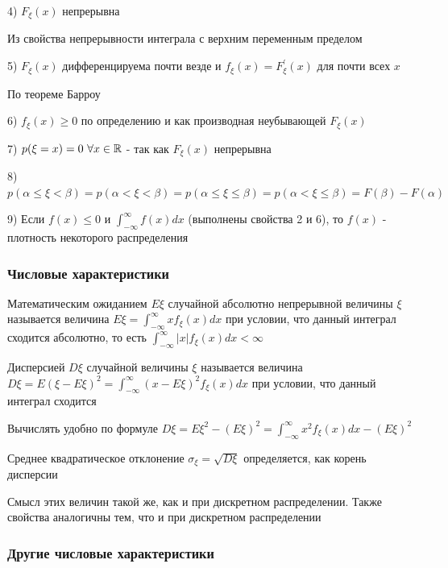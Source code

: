 \documentclass[12pt]{article}
\begin{document}
    4) $F_\xi(x)$ непрерывна 
    
    \begin{MyProof}
        Из свойства непрерывности интеграла с верхним переменным пределом
    \end{MyProof}

    5) $F_\xi(x)$ дифференцируема почти везде и $f_\xi(x) = F^\prime_\xi(x)$ для почти всех $x$
    
    \begin{MyProof}
        По теореме Барроу
    \end{MyProof}

    6) $f_\xi(x) \geq 0$ по определению и как производная неубывающей $F_\xi(x)$

    7) $p(\xi = x) = 0 \ \forall x \in \mathbb{R}$ - так как $F_\xi(x)$ непрерывна

    8) $p(\alpha \leq \xi < \beta) = p(\alpha < \xi < \beta) = p(\alpha \leq \xi \leq \beta) = p(\alpha < \xi \leq \beta) = F(\beta) - F(\alpha)$

    9) \Ths Если $f(x) \leq 0$ и $\int_{-\infty}^{\infty} f(x)dx$ (выполнены свойства 2 и 6), то $f(x)$ - плотность некоторого распределения

    \subsubsection{Числовые характеристики}

    \Def Математическим ожиданием $E\xi$ случайной абсолютно непрерывной величины $\xi$ называется величина $E\xi = \int_{-\infty}^{\infty} xf_\xi(x) dx$ 
    при условии, что данный интеграл сходится абсолютно, то есть $\int_{-\infty}^\infty |x|f_\xi(x)dx < \infty$

    \Def Дисперсией $D\xi$ случайной величины $\xi$ называется величина $D\xi = E(\xi - E\xi)^2 = \int_{-\infty}^\infty (x - E\xi)^2 f_\xi(x) dx$ при условии,
    что данный интеграл сходится

    \Notas Вычислять удобно по формуле $D\xi = E\xi^2 - (E\xi)^2 = \int_{-\infty}^\infty x^2 f_\xi(x)dx - (E\xi)^2$

    \Def Среднее квадратическое отклонение $\sigma_\xi = \sqrt{D\xi}$ определяется, как корень дисперсии

    Смысл этих величин такой же, как и при дискретном распределении. Также свойства аналогичны тем, что и при дискретном распределении

    \subsubsection{Другие числовые характеристики}
\end{document}
